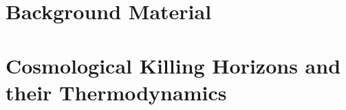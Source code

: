 \documentclass[11pt, a4paper, twoside]{book}
\numberwithin{equation}{section} %
\theoremstyle{plain}
\theoremstyle{definition}
\begin{document}
\frenchspacing
\raggedbottom
{}

\baselineskip=17pt


\cleardoublepage
\cleardoublepage
\cleardoublepage
\cleardoublepage
\cleardoublepage

\cleardoublepage

\cleardoublepage

\fancyhead[RE]{\rightmark}
\fancyhead[LO]{\leftmark}

\cleardoublepage
{}
\cleardoublepage


\cleardoublepage

\part{Background Material}
\label{part:background}


\cleardoublepage


\cleardoublepage


\cleardoublepage


\part{Cosmological Killing Horizons and their Thermodynamics}
\label{part:main}


\cleardoublepage


\cleardoublepage
\end{document}
